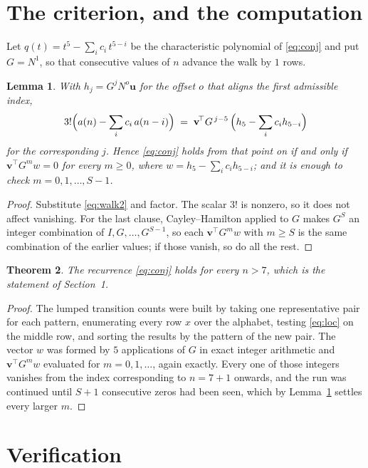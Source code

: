 \documentclass[11pt,a4paper]{article}
\theoremstyle{plain}
\newtheorem{theorem}{Theorem}
\newtheorem{lemma}[theorem]{Lemma}
\theoremstyle{definition}
\begin{document}
\section{The criterion, and the computation}

Let $q(t)=t^{5}-\sum_i c_i\,t^{5-i}$ be the characteristic polynomial of
\eqref{eq:conj} and put $G=N^{1}$, so that consecutive values of $n$ advance the
walk by $1$ rows.

\begin{lemma}\label{lem:crit}
With $h_j=G^{j}N^{o}\mathbf{u}$ for the offset $o$ that aligns the first admissible
index,
\[
3!\Bigl(a(n)-\sum_i c_i\,a(n-i)\Bigr)\;=\;\mathbf{v}^{\!\top}G^{\,j-5}\,
\Bigl(h_{5}-\sum_i c_i h_{5-i}\Bigr)
\]
for the corresponding $j$. Hence \eqref{eq:conj} holds from that point on if and only if
$\mathbf{v}^{\!\top}G^{m}w=0$ for every $m\ge0$, where
$w=h_{5}-\sum_i c_ih_{5-i}$; and it is enough to check $m=0,1,\dots,S-1$.
\end{lemma}

\begin{proof}
Substitute \eqref{eq:walk2} and factor. The scalar $3!$ is nonzero, so it does not
affect vanishing. For the last clause, Cayley--Hamilton applied to $G$ makes $G^{S}$ an
integer combination of $I,G,\dots,G^{S-1}$, so each $\mathbf{v}^{\!\top}G^{m}w$ with
$m\ge S$ is the same combination of the earlier values; if those vanish, so do all the rest.
\end{proof}

\begin{theorem}
The recurrence \eqref{eq:conj} holds for every $n>7$, which is the statement of
Section~1.
\end{theorem}

\begin{proof}
The lumped transition counts were built by taking one representative pair for each pattern,
enumerating every row $x$ over the alphabet, testing \eqref{eq:loc} on the middle
row, and sorting the results by the pattern of the new pair. The vector $w$ was formed by
$5$ applications of $G$ in exact integer arithmetic and $\mathbf{v}^{\!\top}G^{m}w$
evaluated for $m=0,1,\dots$, again exactly. Every one of those integers vanishes from the
index corresponding to $n=7+1$ onwards, and the run was continued until $S+1$
consecutive zeros had been seen, which by Lemma~\ref{lem:crit} settles every larger $m$.
\end{proof}

\section{Verification}
\end{document}
